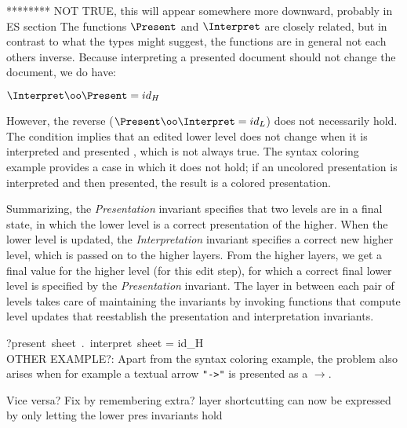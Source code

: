 \bc
{}
******** NOT TRUE, this will appear somewhere more downward, probably in ES section
The functions $\Present$ and $\Interpret$ are closely related, but in contrast to what the types might suggest, the functions are in general not each others inverse. Because interpreting a presented document should not change the document, we do have: 

\begin{small}\begin{math}
\Interpret \oo \Present = id_{H}
\end{math}\end{small}


However, the reverse ($\Present \oo \Interpret = id_{L}$) does not necessarily hold. The condition implies that an edited lower level does not change when it is interpreted and presented , which is not always true. The syntax coloring example provides a case in which it does not hold; if an uncolored presentation is interpreted and then presented, the result is a colored presentation. 
\ec

Summarizing, the {\em Presentation} invariant specifies that two levels are in a final state, in which the lower level is a correct presentation of the higher. When the lower level is updated, the {\em Interpretation} invariant specifies a correct new higher level, which is passed on to the higher layers. From the higher layers, we get a final value for the higher level (for this edit step), for which a correct final lower level is specified by the {\em Presentation} invariant. The layer in between each pair of levels takes care of maintaining the invariants by invoking functions that compute level updates that reestablish the presentation and interpretation invariants.


\bc
?present~sheet~.~interpret~sheet = id_{H}\\

OTHER EXAMPLE?: Apart from the syntax coloring example, the problem also arises when for example a textual arrow 
\verb|"->"| is presented as a $\rightarrow$. 

Vice versa? Fix by remembering extra?
 layer shortcutting can now be expressed by only letting the lower pres invariants hold

